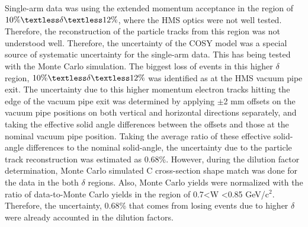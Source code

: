 \documentclass[12pt]{article}
\begin{document}
Single-arm data was using the extended momentum acceptance in the region of  $10\% \textless \delta \textless 12\%$, where the HMS optics were not well tested. Therefore, the reconstruction of the particle tracks from this region was not understood well. Therefore, the uncertainty of the COSY model was a special source of systematic uncertainty for the single-arm data. This has being  tested with the Monte Carlo simulation. The biggest loss of events in this higher $\delta$ region, $10\% \textless \delta \textless 12\%$ was identified as at the HMS vacuum pipe exit. The uncertainty due to this higher momentum electron tracks hitting the edge of the vacuum pipe exit was determined by applying $\pm$2 mm offsets on the vacuum pipe positions on both vertical and horizontal directions separately, and taking the effective solid angle differences between the offsets and those at the nominal vacuum pipe position. Taking the average ratio of these effective solid-angle differences to the nominal solid-angle, the uncertainty due to the particle track reconstruction was estimated as 0.68\%. However, during the dilution factor determination, Monte Carlo simulated C cross-section shape match was done for the data in the both $\delta$ regions. Also, Monte Carlo yields were normalized with the ratio of data-to-Monte Carlo yields in the region of 0.7\textless W \textless 0.85 GeV/c$^2$. Therefore, the uncertainty, 0.68\% that comes from losing events due to higher $\delta$ were already accounted in the dilution factors.
\end{document}
